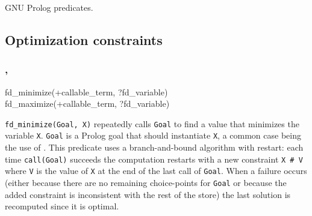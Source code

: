 \begin{PlErrors}







\end{PlErrors}

\Portability

GNU Prolog predicates.

\subsection{Optimization constraints}

\subsubsection{,
               }

\begin{TemplatesOneCol}
fd\_minimize(+callable\_term, ?fd\_variable)\\
fd\_maximize(+callable\_term, ?fd\_variable)

\end{TemplatesOneCol}

\Description

\texttt{fd\_minimize(Goal, X)} repeatedly calls \texttt{Goal} to find a
value that minimizes the variable \texttt{X}. \texttt{Goal} is a Prolog goal
that should instantiate \texttt{X}, a common case being the use of
 . This predicate uses a
branch-and-bound algorithm with restart: each time \texttt{call(Goal)}
succeeds the computation restarts with a new constraint \texttt{X \#{\lt} V}
where \texttt{V} is the value of \texttt{X} at the end of the last call of
\texttt{Goal}. When a failure occurs (either because there are no remaining
choice-points for \texttt{Goal} or because the added constraint is
inconsistent with the rest of the store) the last solution is recomputed
since it is optimal.

